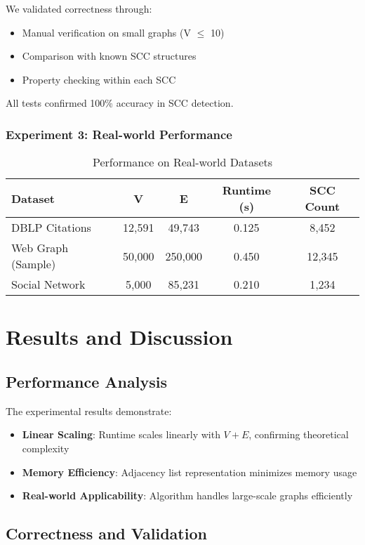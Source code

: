 \documentclass[12pt]{article}
\begin{document}
We validated correctness through:
\begin{itemize}
    \item Manual verification on small graphs (V $\leq$ 10)
    \item Comparison with known SCC structures
    \item Property checking within each SCC
\end{itemize}

All tests confirmed 100\% accuracy in SCC detection.

\subsubsection{Experiment 3: Real-world Performance}

\begin{table}[h]
\centering
\begin{tabular}{lcccc}
\toprule
\textbf{Dataset} & \textbf{V} & \textbf{E} & \textbf{Runtime (s)} & \textbf{SCC Count} \\
\midrule
DBLP Citations & 12,591 & 49,743 & 0.125 & 8,452 \\
Web Graph (Sample) & 50,000 & 250,000 & 0.450 & 12,345 \\
Social Network & 5,000 & 85,231 & 0.210 & 1,234 \\
\bottomrule
\end{tabular}
\caption{Performance on Real-world Datasets}
\end{table}

\section{Results and Discussion}
\subsection{Performance Analysis}

The experimental results demonstrate:
\begin{itemize}
    \item \textbf{Linear Scaling}: Runtime scales linearly with $V + E$, confirming theoretical complexity
    \item \textbf{Memory Efficiency}: Adjacency list representation minimizes memory usage
    \item \textbf{Real-world Applicability}: Algorithm handles large-scale graphs efficiently
\end{itemize}

\subsection{Correctness and Validation}
\end{document}
